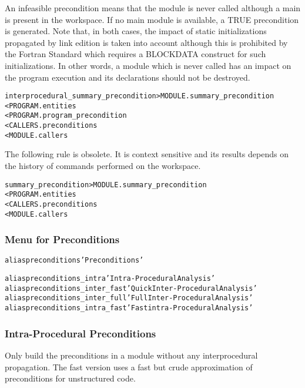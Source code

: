 \documentclass[a4paper]{report}
\newenvironment{PipsMake}{\begin{alltt}}{\end{alltt}}
\newenvironment{PipsPass}[1]{\label{pass:#1}}{}
\begin{document}
An infeasible precondition means that the module is never called although
a main is present in the workspace. If no main module is available, a TRUE
precondition is generated. Note that, in both cases, the impact of static
initializations propagated by link edition is taken into account although
this is prohibited by the Fortran Standard which requires a BLOCKDATA
construct for such initializations. In other words, a module which is
never called has an impact on the program execution and its declarations
should not be destroyed.

\begin{PipsMake}
interprocedural_summary_precondition            > MODULE.summary_precondition
        < PROGRAM.entities
        < PROGRAM.program_precondition
        < CALLERS.preconditions
        < MODULE.callers
\end{PipsMake}

The following rule is obsolete. It is context sensitive and its results
depends on the history of commands performed on the workspace.

\begin{PipsMake}
summary_precondition            > MODULE.summary_precondition
        < PROGRAM.entities
        < CALLERS.preconditions
        < MODULE.callers
\end{PipsMake}

\subsubsection{Menu for Preconditions}

\begin{PipsMake}
alias preconditions 'Preconditions'

alias preconditions_intra 'Intra-Procedural Analysis'
alias preconditions_inter_fast 'Quick Inter-Procedural Analysis'
alias preconditions_inter_full 'Full Inter-Procedural Analysis'
alias preconditions_intra_fast 'Fast intra-Procedural Analysis'
\end{PipsMake}

\subsubsection{Intra-Procedural Preconditions}

\begin{PipsPass}{preconditions_intra}
Only build the preconditions in a module without any interprocedural
propagation. The fast version uses a fast but crude approximation of
preconditions for unstructured code.
\end{PipsPass}
\end{document}
